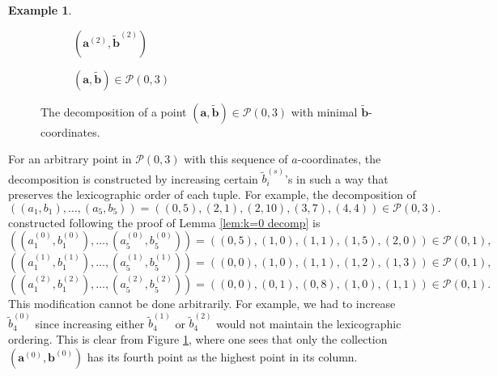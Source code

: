\documentclass[12pt]{amsart}
\newcommand{\aaa}{\mathbf{a}}
\newcommand{\bbb}{\mathbf{b}}
\numberwithin{equation}{section}
\theoremstyle{definition}
\newtheorem{example}[theorem]{Example}
\begin{document}
\begin{example}
\begin{figure}[h]
\begin{subfigure}{.2\textwidth}
    \caption{$\left(\aaa^{(2)},\widetilde{\bbb}^{(2)}\right)$}
    \end{subfigure}%
    \begin{subfigure}{.3\textwidth}
    \caption{$\left(\aaa,\widetilde{\bbb}\right)\in \mathcal{P}(0,3)$}
    \end{subfigure}%
    \caption{The decomposition of a point $(\aaa,\widetilde{\bbb})\in \mathcal{P}(0,3)$ with minimal $\widetilde{\bbb}$-coordinates.}
    \label{fig:P(0,k) decomp}
    \end{figure}
    For an arbitrary point in $\mathcal{P}(0,3)$ with this sequence of $a$-coordinates, the decomposition is constructed by increasing certain $\widetilde{b}^{(s)}_i$'s in such a way that preserves the lexicographic order of each tuple. For example, the decomposition of
    \[ ((a_1,b_1),\dots,(a_5,b_5)) = ((0,5),(2,1),(2,10),(3,7),(4,4)) \in \mathcal{P}(0,3). \]
    constructed following the proof of Lemma \ref{lem:k=0 decomp} is
    \[ \left(\left(a^{(0)}_1,b^{(0)}_1\right),\dots,\left(a^{(0)}_5,b^{(0)}_5\right)\right) = ((0,5),(1,0),(1,1),(1,5),(2,0))\in \mathcal{P}(0,1), \]
    \[ \left(\left(a^{(1)}_1,b^{(1)}_1\right),\dots,\left(a^{(1)}_5,b^{(1)}_5\right)\right) = ((0,0),(1,0),(1,1),(1,2),(1,3))\in \mathcal{P}(0,1), \]
    \[ \left(\left(a^{(2)}_1,b^{(2)}_1\right),\dots,\left(a^{(2)}_5,b^{(2)}_5\right)\right) = ((0,0),(0,1),(0,8),(1,0),(1,1))\in \mathcal{P}(0,1). \]
    This modification cannot be done arbitrarily. For example, we had to increase $\widetilde{b}^{(0)}_4$ since increasing either $\widetilde{b}^{(1)}_4$ or $\widetilde{b}^{(2)}_4$ would not maintain the lexicographic ordering. This is clear from Figure \ref{fig:P(0,k) decomp}, where one sees that only the collection $(\aaa^{(0)},\bbb^{(0)})$ has its fourth point as the highest point in its column.  
\end{example}
\end{document}
